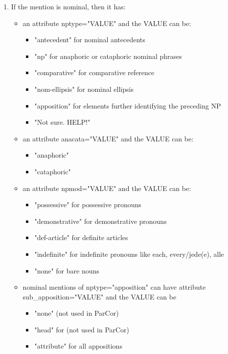 \documentclass[a4paper]{article}
\begin{document}
{{\begin{enumerate}
\begin{itemize}
 \item an attribute comparative="VALUE" and the VALUE can be:
  \begin{itemize}
 \item "part" for particular comparative reference
 \item "gen" for general comparative reference
 \end{itemize}

\end{itemize}

\item If the mention is nominal, then it has: 

\begin{itemize}

\item an attribute nptype="VALUE" and the VALUE can be:
\begin{itemize}
\item "antecedent" for nominal antecedents 
\item "np" for anaphoric or cataphoric nominal phrases
\item "comparative" for comparative reference
\item "nom-ellipsis" for nominal ellipsis
\item "apposition" for elements further identifying the preceding NP
\item "Not sure. HELP!"
\end{itemize}
  
 \item an attribute anacata="VALUE" and the VALUE can be:
  \begin{itemize}
 \item "anaphoric" 
 \item "cataphoric" 
 \end{itemize}
 
 \item an attribute npmod="VALUE" and the VALUE can be:
 \begin{itemize}
 \item "possessive" for possessive pronouns
 \item "demonstrative"  for demonstrative pronouns
\item "def-article"  for definite articles
\item "indefinite"  for indefinite pronouns like each, every/jede(e), alle
\item "none" for bare nouns
 \end{itemize}
 
 
 \item nominal mentions of nptype="apposition" can have attribute sub\_apposition="VALUE" and the VALUE can be
 \begin{itemize}
 \item "none" (not used in ParCor)
 \item "head" for (not used in ParCor)
 \item "attribute" for all appositions
 \end{itemize}
\end{itemize}


\end{enumerate}}}
\end{document}

